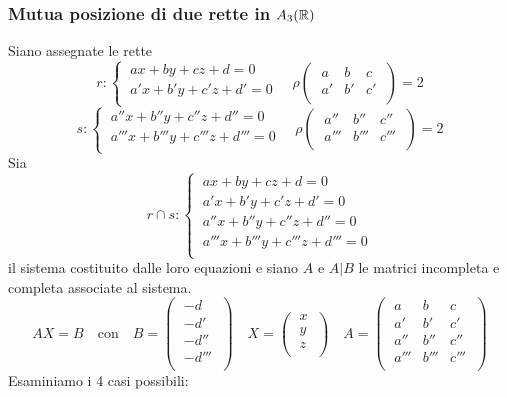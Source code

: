 \documentclass[twoside]{report}
\begin{document}
\subsubsection{Mutua posizione di due rette in \(A_3(\RR )\)}
Siano assegnate le rette \[
r :
\begin{cases}
    \ ax + by + cz + d = 0 \\
    \ a'x + b'y + c'z + d' = 0 \\
\end{cases} \quad \rho
\left( \; \begin{matrix}
    a & b & c \\
    a' & b' & c' \\
\end{matrix} \; \right) = 2
\] \[
s :
\begin{cases}
    \ a ''x + b ''y + c ''z + d '' = 0 \\
    \ a'''x + b'''y + c'''z + d''' = 0 \\
\end{cases} \quad \rho
\left( \; \begin{matrix}
    a ''& b '' & c ''\\
    a''' & b''' & c''' \\
\end{matrix} \; \right) = 2
\] Sia \[
r \cap s:
\begin{cases}
    \ ax + by + cz + d = 0 \\
    \ a'x + b'y + c'z + d' = 0 \\
    \ a ''x + b ''y + c ''z + d '' = 0 \\
    \ a'''x + b'''y + c'''z + d''' = 0 \\
\end{cases}
\] il sistema costituito dalle loro equazioni e siano \(A\) e \(A|B\) le matrici incompleta e completa associate al sistema. \[
AX = B \quad \text{con} \quad B =
\left( \; \begin{matrix}
    -d \\
    -d' \\
    -d'' \\
    -d''' \\
\end{matrix} \; \right) 
\quad X = 
\left( \; \begin{matrix}
    x \\
    y \\
    z \\
\end{matrix} \; \right) 
\quad A =
\left( \; \begin{matrix}
    a & b & c \\
    a' & b' & c' \\
    a '' & b '' & c '' \\
    a''' & b''' & c''' \\
\end{matrix} \; \right) 
\] Esaminiamo i 4 casi possibili:
\end{document}
